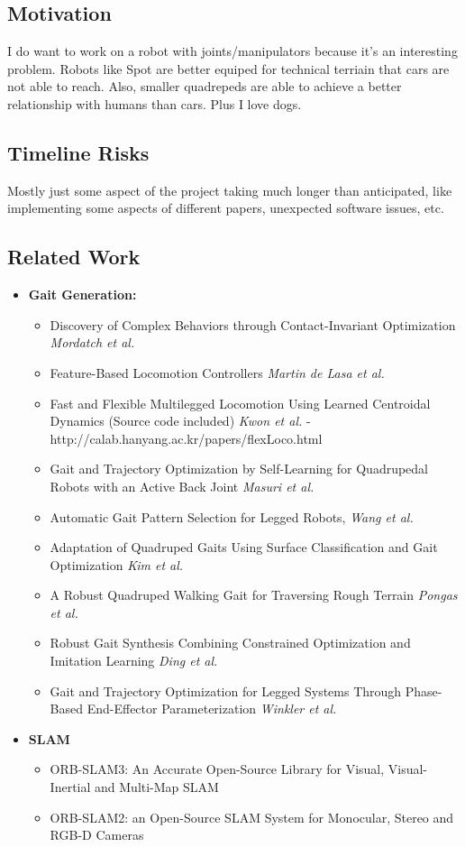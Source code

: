 \documentclass{article}
\theoremstyle{definition}
\theoremstyle{note}
\begin{document}
\subsection*{Motivation}
I do want to work on a robot with joints/manipulators because it's an interesting problem.
Robots like Spot are better equiped for technical terriain that cars are not able to reach. Also, 
smaller quadrepeds are able to achieve a better relationship with humans than cars.
Plus I love dogs.

\subsection*{Timeline Risks}
Mostly just some aspect of the project taking much longer than anticipated, like implementing some aspects
of different papers, unexpected software issues, etc.



\subsection*{Related Work}
\begin{itemize}
\item \textbf{Gait Generation:}
    \begin{itemize}
    \item Discovery of Complex Behaviors through Contact-Invariant Optimization \textit{Mordatch et al.}
    \item Feature-Based Locomotion Controllers \textit{Martin de Lasa et al.}
    \item Fast and Flexible Multilegged Locomotion Using Learned Centroidal Dynamics (Source code included) \textit{Kwon et al.} - http://calab.hanyang.ac.kr/papers/flexLoco.html
    \item Gait and Trajectory Optimization by Self-Learning for Quadrupedal Robots with an Active Back Joint \textit{Masuri et al.}
    \item Automatic  Gait  Pattern  Selection for  Legged  Robots, \textit{Wang et al.}
    \item Adaptation  of  Quadruped  Gaits  Using  Surface Classification  and  Gait  Optimization \textit{Kim et al.}
    \item A Robust Quadruped Walking Gait for  Traversing Rough Terrain \textit{Pongas et al.}
    \item Robust  Gait  Synthesis  Combining  Constrained  Optimization  and Imitation Learning \textit{Ding et al.}
    \item Gait and Trajectory Optimization for Legged Systems Through Phase-Based End-Effector Parameterization \textit{Winkler et al.}
    \end{itemize}
\item \textbf{SLAM} 
    \begin{itemize}
        \item ORB-SLAM3: An Accurate Open-Source Library for Visual, Visual-Inertial and Multi-Map SLAM
        \item ORB-SLAM2: an Open-Source SLAM System for Monocular, Stereo and RGB-D Cameras
    \end{itemize}
\end{itemize}
\end{document}
